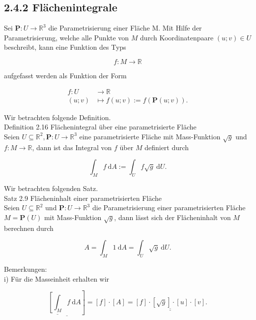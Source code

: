 \documentclass[10pt]{article}
\begin{document}
\subsection*{2.4.2 Flächenintegrale}
Sei $\mathbf{P}: U \rightarrow \mathbb{R}^{3}$ die Parametrisierung einer Fläche M. Mit Hilfe der Parametrisierung, welche alle Punkte von $M$ durch Koordinatenpaare $(u ; v) \in U$ beschreibt, kann eine Funktion des Typs


\begin{equation*}
f: M \rightarrow \mathbb{R} \tag{2.113}
\end{equation*}


aufgefasst werden als Funktion der Form


\begin{align*}
f: U & \rightarrow \mathbb{R} \\
(u ; v) & \mapsto f(u ; v):=f(\mathbf{P}(u ; v)) . \tag{2.114}
\end{align*}


Wir betrachten folgende Definition.\\
Definition 2.16 Flächenintegral über eine parametrisierte Fläche\\
Seien $U \subseteq \mathbb{R}^{2}, \mathbf{P}: U \rightarrow \mathbb{R}^{3}$ eine parametrisierte Fläche mit Mass-Funktion $\sqrt{g}$ und $f: M \rightarrow \mathbb{R}$, dann ist das Integral von $f$ über $M$ definiert durch


\begin{equation*}
\int_{M} f \mathrm{~d} A:=\int_{U} f \sqrt{g} \mathrm{~d} U . \tag{2.115}
\end{equation*}


Wir betrachten folgenden Satz.\\
Satz 2.9 Flächeninhalt einer parametrisierten Fläche\\
Seien $U \subseteq \mathbb{R}^{2}$ und $\mathbf{P}: U \rightarrow \mathbb{R}^{3}$ die Parametrisierung einer parametrisierten Fläche $M=\mathbf{P}(U)$ mit Mass-Funktion $\sqrt{g}$, dann lässt sich der Flächeninhalt von $M$ berechnen durch


\begin{equation*}
A=\int_{M} 1 \mathrm{~d} A=\int_{U} \sqrt{g} \mathrm{~d} U . \tag{2.116}
\end{equation*}


Bemerkungen:\\
i) Für die Masseinheit erhalten wir


\begin{equation*}
\underline{\left.\underline{\left[\int_{M}\right.} f \mathrm{~d} A\right]}=[f] \cdot[A]=\underline{\underline{[f] \cdot[\sqrt{g}] \cdot[u] \cdot[v]}} . \tag{2.117}
\end{equation*}
\end{document}
